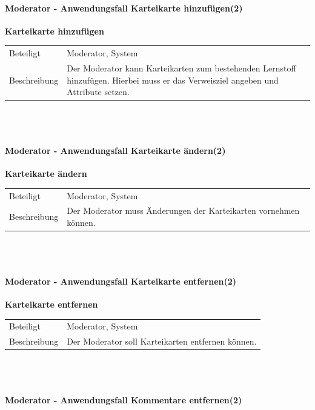 \documentclass[12pt,a4paper]{article}
\begin{document}
{	
	\paragraph{Moderator - Anwendungsfall \glqq Karteikarte hinzufügen\grqq (2)}\mbox{}
	
	\textbf{Karteikarte hinzufügen}\\
	\begin{tabular}{l|p{12cm}}
		\hline 
		Beteiligt & Moderator, System \\ 
		Beschreibung & Der Moderator kann Karteikarten zum bestehenden Lernstoff hinzufügen. Hierbei muss er das Verweisziel angeben und Attribute setzen. \\ 
	\end{tabular}\\\\
	
	\paragraph{Moderator - Anwendungsfall \glqq Karteikarte ändern\grqq (2)}\mbox{}
	
	\textbf{Karteikarte ändern}\\
	\begin{tabular}{l|p{12cm}}
		\hline 
		Beteiligt & Moderator, System \\ 
		Beschreibung & Der Moderator muss Änderungen der Karteikarten vornehmen können. \\ 
	\end{tabular}\\\\
	
	\newpage
	
	\paragraph{Moderator - Anwendungsfall \glqq Karteikarte entfernen\grqq (2)}\mbox{}
	
	\textbf{Karteikarte entfernen}\\
	\begin{tabular}{l|p{12cm}}
		\hline 
		Beteiligt & Moderator, System \\ 
		Beschreibung & Der Moderator soll Karteikarten entfernen können. \\ 
	\end{tabular}\\\\
	
	
	\paragraph{Moderator - Anwendungsfall \glqq Kommentare entfernen\grqq (2)}\mbox{}
	
}
\end{document}
